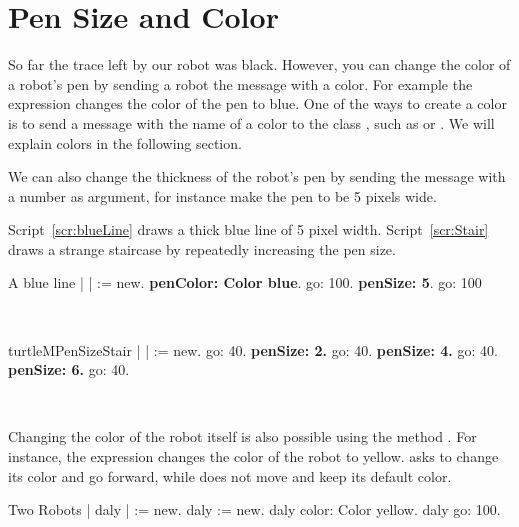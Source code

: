 \section{Pen Size and Color}
So far the trace left by our robot was black. However, you can change the color of a robot's pen by sending a robot the message   with a color. For example the expression  changes the color of the pen to blue. One of the ways to create a color is to send a message with the name of a color to the class , such as  or . We will explain colors in the following section.

We can also change the thickness of the robot's pen by sending the message  with a number as argument, for instance  make the pen to be 5 pixels wide.

Script~\ref{scr:blueLine} draws a thick blue line of 5 pixel width. Script~\ref{scr:Stair} draws a strange staircase by repeatedly increasing the pen size.

\begin{scriptwithtitle}{A blue line}\label{scr:blueLine}
| \caro |
\caro := \Turtle new.
\caro \textbf{penColor: Color blue}.
\caro go: 100.
\caro \textbf{penSize: 5}.
\caro go: 100
\end{scriptwithtitle}


\ 


\begin{scriptfig}{turtleMPenSize}{Stair}\label{scr:Stair}
| \caro |
\caro := \Turtle new.
\caro go: 40.
\textbf{\caro penSize: 2.}
\caro go: 40.
\textbf{\caro penSize: 4.}
\caro go: 40.
\textbf{\caro penSize: 6.}
\caro go: 40.
\end{scriptfig}

\ 

Changing the color of the robot itself is also possible using the
method . For instance, the expression  changes the color of  the robot to yellow.  asks  to change its color and go forward, while \caro does not move and keep its default color.

\begin{scriptwithtitle}{Two Robots}\label{scr:yellowturtle}
| \caro daly |
\caro := \Turtle new.
daly  := \Turtle new.
daly color: Color yellow.
daly go: 100.
\end{scriptwithtitle}




